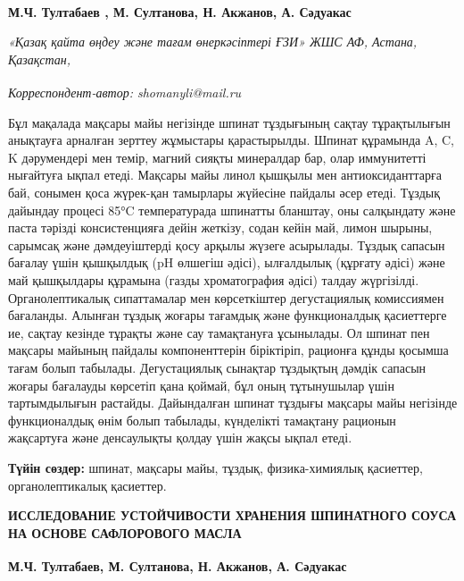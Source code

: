 
\begin{articleheader}

{\bfseries
М.Ч. Тултабаев\textsuperscript{\envelope } \authorid,
М. Султанова\authorid,
Н. Акжанов\authorid,
А. Сәдуакас\authorid}
\end{articleheader}

\begin{affiliation}
\emph{«Қазақ қайта өңдеу және тағам өнеркәсіптері ҒЗИ» ЖШС АФ, Астана, Қазақстан,}

\raggedright \textsuperscript{\envelope }{\em Корреспондент-автор: shomanyli@mail.ru}
\end{affiliation}

Бұл мақалада мақсары майы негізінде шпинат тұздығының сақтау
тұрақтылығын анықтауға арналған зерттеу жұмыстары қарастырылды. Шпинат
құрамында A, C, K дәрумендері мен темір, магний сияқты минералдар бар,
олар иммунитетті нығайтуға ықпал етеді. Мақсары майы линол қышқылы мен
антиоксиданттарға бай, сонымен қоса жүрек-қан тамырлары жүйесіне пайдалы
әсер етеді. Тұздық дайындау процесі 85°C температурада шпинатты
бланштау, оны салқындату және паста тәрізді консистенцияға дейін
жеткізу, содан кейін май, лимон шырыны, сарымсақ және дәмдеуіштерді қосу
арқылы жүзеге асырылады. Тұздық сапасын бағалау үшін қышқылдық (pH
өлшегіш әдісі), ылғалдылық (құрғату әдісі) және май қышқылдары құрамына
(газды хроматография әдісі) талдау жүргізілді. Органолептикалық
сипаттамалар мен көрсеткіштер дегустациялық комиссиямен бағаланды.
Алынған тұздық жоғары тағамдық және функционалдық қасиеттерге ие, сақтау
кезінде тұрақты және сау тамақтануға ұсынылады. Ол шпинат пен мақсары
майының пайдалы компоненттерін біріктіріп, рационға құнды қосымша тағам
болып табылады. Дегустациялық сынақтар тұздықтың дәмдік сапасын жоғары
бағалауды көрсетіп қана қоймай, бұл оның тұтынушылар үшін тартымдылығын
растайды. Дайындалған шпинат тұздығы мақсары майы негізінде
функционалдық өнім болып табылады, күнделікті тамақтану рационын
жақсартуға және денсаулықты қолдау үшін жақсы ықпал етеді.

{\bfseries Түйін сөздер:} шпинат, мақсары майы, тұздық, физика-химиялық
қасиеттер, органолептикалық қасиеттер.

\begin{articleheader}
{\bfseries ИССЛЕДОВАНИЕ УСТОЙЧИВОСТИ ХРАНЕНИЯ ШПИНАТНОГО СОУСА НА ОСНОВЕ
САФЛОРОВОГО МАСЛА}

{\bfseries
М.Ч. Тултабаев\textsuperscript{\envelope },
М. Султанова,
Н. Акжанов,
А. Сәдуакас}
\end{articleheader}

